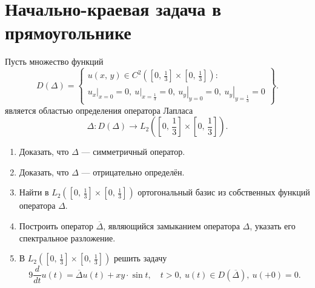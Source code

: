 \documentclass[a4paper]{article}
\begin{document}
\section{Начально-краевая задача в прямоугольнике}
\begin{hiProb}[№20]
Пусть множество функций
\[%
	D(\Delta)= \left\{
		\begin{gathered}
			u(x,\,y) \in  C^2\left( \left[ 0,\,
	\frac{1}{3}\right] \times \left[ 0,\,\frac{1}{3} \right]  \right) \colon\\
\left. u_x \right|_{x=0}=0,\ \left. u \right|_{x=\frac{1}{3}}=0,\ \left. u_y \right|_{y=0}=0,\ \left. u_y \right|_{y=\frac{1}{3}}=0
		\end{gathered}   \right\} 
.\] 
является областью определения оператора Лапласа
\[
	\Delta \colon D(\Delta)\to L_2 \left( \left[ 0,\, \frac{1}{3} \right] \times \left[ 0,\,\frac{1}{3} \right]  \right) 
.\] 
\begin{enumerate}
\item Доказать, что $\Delta$ --- симметричный оператор.
\item Доказать, что $\Delta$ --- отрицательно определён.
\item Найти в $\displaystyle  L_2 \left( \left[ 0,\,\frac{1}{3} \right] \times \left[ 0,\,\frac{1}{3} \right]  \right) $ ортогональный
	базис из собственных  функций оператора $\Delta$.
\item Построить оператор $\overline{\Delta}$, являющийся замыканием
	оператора $\Delta$, указать его спектральное разложение.
\item В $\displaystyle L_2 \left( \left[ 0,\,\frac{1}{3} \right] \times \left[ 0,\,\frac{1}{3} \right]  \right) $ решить задачу
\[
	9 \frac{d}{dt}u(t)=\overline{\Delta} u(t)+xy\cdot \sin t,
	\quad t>0,\ u(t) \in D\left( \overline{\Delta} \right),
	\ u(+0)=0
.\] 
\end{enumerate}
\end{hiProb}
\end{document}

